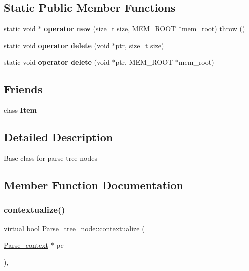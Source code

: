 \subsection*{Static Public Member Functions}
\begin{DoxyCompactItemize}
\item 
\mbox{\label{classParse__tree__node_a50b8b39a50970157f72088b1bc77c7b5}} 
static void $\ast$ {\bfseries operator new} (size\+\_\+t size, M\+E\+M\+\_\+\+R\+O\+OT $\ast$mem\+\_\+root)  throw ()
\item 
\mbox{\label{classParse__tree__node_a01dfd50de12b1b82a72b7e1a54fd51de}} 
static void {\bfseries operator delete} (void $\ast$ptr, size\+\_\+t size)
\item 
\mbox{\label{classParse__tree__node_aa89e46e72ef0021d9a13a4ba6f978ad5}} 
static void {\bfseries operator delete} (void $\ast$ptr, M\+E\+M\+\_\+\+R\+O\+OT $\ast$mem\+\_\+root)
\end{DoxyCompactItemize}
\subsection*{Friends}
\begin{DoxyCompactItemize}
\item 
\mbox{\label{classParse__tree__node_aad85754f188b769ff61150eaf36106c4}} 
class {\bfseries Item}
\end{DoxyCompactItemize}


\subsection{Detailed Description}
Base class for parse tree nodes 

\subsection{Member Function Documentation}
\mbox{\label{classParse__tree__node_a22d93524a537d0df652d7efa144f23da}} 
\subsubsection{\texorpdfstring{contextualize()}{contextualize()}}
{\footnotesize\ttfamily virtual bool Parse\+\_\+tree\+\_\+node\+::contextualize (\begin{DoxyParamCaption}\item[{\mbox{\hyperlink{structParse__context}{Parse\+\_\+context}} $\ast$}]{pc }\end{DoxyParamCaption})\hspace{0.3cm}{\ttfamily [inline]}, {\ttfamily [virtual]}}


